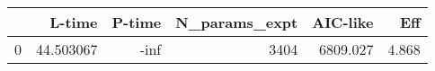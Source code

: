 \begin{tabular}{lrrrrr}
\toprule
{} &     L-time &  P-time &  N\_params\_expt &  AIC-like &    Eff \\
\midrule
0 &  44.503067 &    -inf &           3404 &  6809.027 &  4.868 \\
\bottomrule
\end{tabular}
